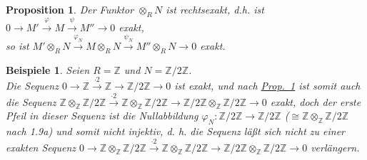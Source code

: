 \documentclass[a4paper,12pt]{scrbook}
\theoremstyle{break}
\newtheorem{Prop}[Def]{Proposition}
\theoremstyle{nonumberbreak}
\newtheorem{nnBsp}{Beispiele}
\theoremstyle{nonumberplain}
\newcommand{\myref}[2]{%
\hyperref[#2]{#1~\ref*{#2}}%
}
\begin{document}
\begin{Prop}
\label{1.12}
  Der Funktor $\otimes_R N$ ist rechtsexakt, d.h. ist $0 \to M'
  \overset{\varphi}{\to} M \overset{\psi}{\to} M'' \to 0$ exakt,\\
  so ist $ M' \otimes_R N \overset{\varphi_N}{\to} M \otimes_R N \overset{\psi_N}{\to} M'' \otimes_R N \to 0$ exakt.
\end{Prop}

\begin{nnBsp} 
  Seien $R = \mathbb{Z}$ und $N = \mathbb{Z}/2 \mathbb{Z}$.\\
  Die Sequenz $0 \to \mathbb{Z} \overset{ \cdot 2}{\to} \mathbb{Z} \to \mathbb{Z}/2
  \mathbb{Z} \to 0$ ist exakt, und nach \myref{Prop.}{1.12} ist somit auch die
  Sequenz
  $\mathbb{Z} \otimes_{\mathbb{Z}} \mathbb{Z} / 2 \mathbb{Z}  \overset{ \cdot 2}{\to} \mathbb{Z} \otimes_{\mathbb{Z}} \mathbb{Z} / 2  \mathbb{Z} \to \mathbb{Z}/2
  \mathbb{Z} \otimes_{\mathbb{Z}} \mathbb{Z} / 2 \mathbb{Z} \to 0$ exakt,
  doch der erste Pfeil in dieser Sequenz ist die Nullabbildung
   $\varphi_N: \mathbb{Z}/2 \mathbb{Z} \to \mathbb{Z} / 2 \mathbb{Z}$ ($\cong
  \mathbb{Z} \otimes_{\mathbb{Z}} \mathbb{Z} / 2 \mathbb{Z}$ nach 1.9a) und
   somit nicht injektiv, d. h. die Sequenz läßt sich nicht zu einer exakten Sequenz
   $0 \to \mathbb{Z} \otimes_{\mathbb{Z}} \mathbb{Z} / 2 \mathbb{Z}  \overset{ \cdot 2}{\to} \mathbb{Z} \otimes_{\mathbb{Z}} \mathbb{Z} / 2  \mathbb{Z} \to \mathbb{Z}/2
  \mathbb{Z} \otimes_{\mathbb{Z}} \mathbb{Z} / 2 \mathbb{Z} \to 0$ verlängern.
\end{nnBsp}
\end{document}
